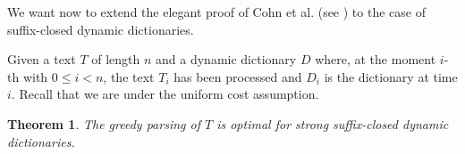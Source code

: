 \documentclass[12pt]{article}
\theoremstyle{plain}
\newtheorem{theorem}{Theorem}[section]
\theoremstyle{definition}
\theoremstyle{remark}
\begin{document}
We want now to extend 
the elegant proof of Cohn et al. (see \cite{DBLP:conf/dcc/CohnK96}) to the case of suffix-closed dynamic dictionaries.




Given a text $T$ of length $n$ and a dynamic dictionary $D$ where, at the moment $i$-th with $0\leq i < n$, the text $T_i$ has been processed and $D_i$ is the dictionary  at time $i$. Recall that we are under the uniform cost assumption.

\begin{figure}[t] \end{figure}



\begin{theorem}\label{the:cohngeneralizzato}
The greedy parsing of $T$ is optimal for \textit{strong} suffix-closed dynamic dictionaries.
\end{theorem}
\end{document}
